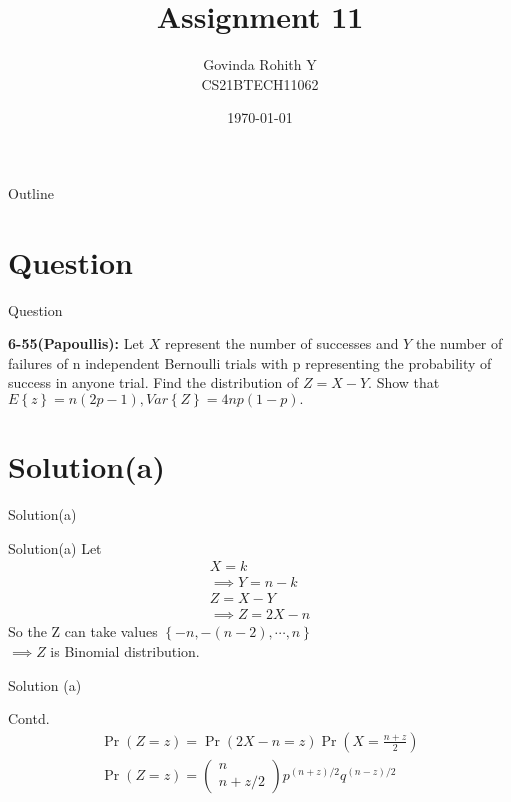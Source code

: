 \documentclass{beamer}
\title{Assignment 11}
\author{Govinda Rohith Y\\CS21BTECH11062}
\date{\today}
\providecommand{\pr}[1]{\ensuremath{\Pr\left(#1\right)}}
\providecommand{\cbrak}[1]{\ensuremath{\left\{#1\right\}}}
\newcommand{\myvec}[1]{\ensuremath{\begin{pmatrix}#1\end{pmatrix}}}
\begin{document}
\begin{frame}
    \titlepage 
\end{frame}

\logo{}


\begin{frame}{Outline}
    \tableofcontents
\end{frame}


\section{Question}
\begin{frame}{Question}

\begin{block}{\textbf{6-55(Papoullis):}}
         Let $X$ represent the number of successes and $Y$ the number of failures of n independent
Bernoulli trials with p representing the probability of success in anyone trial. Find the distribution of $Z =X -Y$. Show that $E\cbrak{z} = n(2p - 1), Var\cbrak{Z} = 4np(1 - p). $
    \end{block}

\end{frame}
\section{Solution(a)}
\begin{frame}{Solution(a)}
    \begin{block}{Solution(a)}
    Let 
    \begin{align}
        X=k\\
        \implies Y=n-k\\
        Z=X-Y\\
        \implies \boxed{Z=2X-n}
    \end{align}
    So the Z can take values $\cbrak{-n,-(n-2),\cdots,n}$\\
    $\implies Z$ is Binomial distribution.
    \end{block}
\end{frame}
\begin{frame}{Solution (a)}
    \begin{block}{Contd.}
    \begin{align}
        \pr{ Z=z }=\pr{2X-n=z}\pr{X=\frac{n+z}{2}}\\
        \pr{Z=z}=\myvec{n\\n+z/2}p^{{(n+z)}/2} q^{{(n-z)}/2}
    \end{align}
    \end{block}
\end{frame}
\end{document}
